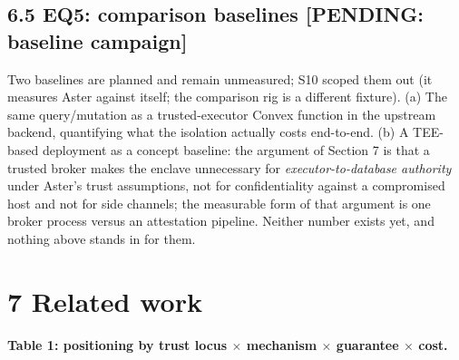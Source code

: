 \documentclass[
  11pt,
]{article}
\begin{document}
\subsection{6.5 EQ5: comparison baselines {[}PENDING: baseline campaign{]}}\label{eq5-comparison-baselines-pending-baseline-campaign}

Two baselines are planned and remain unmeasured; S10 scoped them out (it measures Aster against itself; the comparison rig is a different fixture). (a) The same query/mutation as a trusted-executor Convex function in the upstream backend, quantifying what the isolation actually costs end-to-end. (b) A TEE-based deployment as a concept baseline: the argument of Section 7 is that a trusted broker makes the enclave unnecessary for \emph{executor-to-database authority} under Aster's trust assumptions, not for confidentiality against a compromised host and not for side channels; the measurable form of that argument is one broker process versus an attestation pipeline. Neither number exists yet, and nothing above stands in for them.

\section{7 Related work}\label{related-work}

\textbf{Table 1: positioning by trust locus $\times$ mechanism $\times$ guarantee $\times$ cost.}
\end{document}
